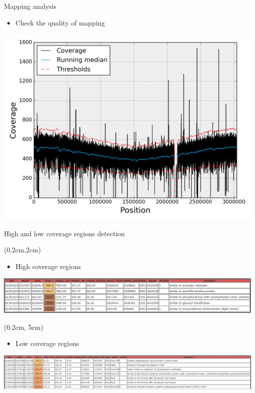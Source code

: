 \documentclass{beamer}
\begin{document}
\begin{frame}{Mapping analysis}
    \begin{itemize}
        \item Check the quality of mapping
    \end{itemize}
    \center
    \includegraphics[scale=0.4]{images/running_median}
\end{frame}

\begin{frame}{High and low coverage regions detection}
    \begin{textblock*}{10cm}(0.2cm,2cm)
        \begin{itemize}
            \item High coverage regions
        \end{itemize}
        \includegraphics[scale=0.195]{images/high_roi}
    \end{textblock*}
    \begin{textblock*}{10cm}(0.2cm, 5cm)
        \begin{itemize}
            \item Low coverage regions
        \end{itemize}
        \includegraphics[scale=0.145]{images/low_roi}
    \end{textblock*}
\end{frame}
\end{document}
